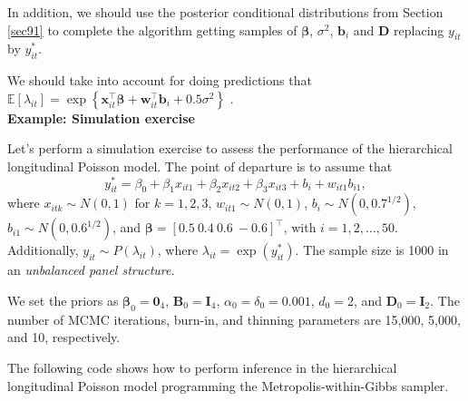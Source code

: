 In addition, we should use the posterior conditional distributions from Section \ref{sec91} to complete the algorithm getting samples of $\bm{\beta}$, $\sigma^2$, $\bm{b}_i$ and $\bm{D}$ replacing $y_{it}$ by ${y}_{it}^*$.

We should take into account for doing predictions that $\mathbb{E}[{\lambda}_{it}]=\exp\left\{\bm{x}_{it}^{\top}\bm{\beta}+\bm{w}_{it}^{\top}\bm{b}_i+0.5\sigma^2\right\}$ \cite[~pag. 137]{diggle2002analysis}.\\

\textbf{Example: Simulation exercise}

Let's perform a simulation exercise to assess the performance of the hierarchical longitudinal Poisson model. The point of departure is to assume that 
\[
y_{it}^* = \beta_0 + \beta_1 x_{it1} + \beta_2 x_{it2} + \beta_3 x_{it3} + b_i + w_{it1} b_{i1},
\]
where $x_{itk} \sim N(0,1)$ for $k = 1, 2, 3$, $w_{it1} \sim N(0,1)$, $b_i \sim N(0, 0.7^{1/2})$, $b_{i1} \sim N(0, 0.6^{1/2})$, and $\bm{\beta} = [0.5 \ 0.4 \ 0.6 \ -0.6]^{\top}$, with $i = 1, 2, \dots, 50$. Additionally, $y_{it} \sim P(\lambda_{it})$, where $\lambda_{it} = \exp(y_{it}^*)$. The sample size is 1000 in an \textit{unbalanced panel structure}.

We set the priors as $\bm{\beta}_0 = \bm{0}_4$, $\bm{B}_0 = \bm{I}_4$, $\alpha_0 = \delta_0 = 0.001$, $d_0 = 2$, and $\bm{D}_0 = \bm{I}_2$. The number of MCMC iterations, burn-in, and thinning parameters are 15,000, 5,000, and 10, respectively.

The following code shows how to perform inference in the hierarchical longitudinal Poisson model programming the Metropolis-within-Gibbs sampler.


